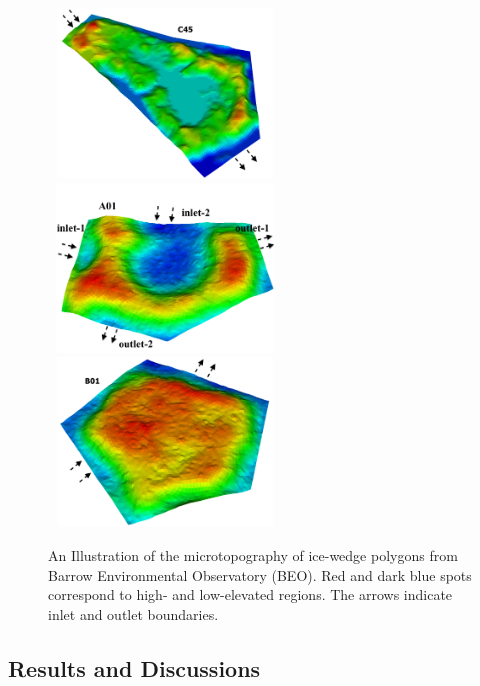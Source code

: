 \documentclass[review,11pt]{elsarticle}
\begin{document}
\begin{figure}[!htb]
 \includegraphics[width=6.2cm, height=4.5cm]{./figures/polygons-finescale/3Dpolygon45-3B.png}
\includegraphics[width=6.2cm, height=4.5cm]{./figures/polygons-finescale/3DpolygonA01-3D.png}\\
\includegraphics[width=6.2cm, height=4.5cm]{./figures/polygons-finescale/3DpolygonB01-3B.png}
\caption{An Illustration of the microtopography of ice-wedge polygons from Barrow Environmental Observatory (BEO). Red and dark blue spots correspond to high- and low-elevated regions. The arrows indicate inlet and outlet boundaries.}
\label{IWP-finescale}
\end{figure}
\FloatBarrier
\subsection{Results and Discussions}
\end{document}
